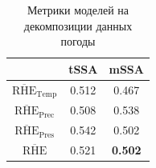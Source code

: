 	\def\arraystretch{1.2}
	\begin{table}[h!]
		\centering
		\caption{Метрики моделей на декомпозиции данных погоды}\label{tab:decomp_weather_results}
		\begin{tabular}{|c|c|c|}
			\hline
			& tSSA  & mSSA           \\ \hline
			$ \overline{\text{RHE}}_{\text{Temp}} $   & 0.512 & 0.467          \\ \hline
			$ \overline{\text{RHE}}_{\text{Prec}} $ & 0.508 & 0.538          \\ \hline
			$ \overline{\text{RHE}}_{\text{Pres}} $   & 0.542 & 0.502          \\ \hline
			$ \overline{\text{RHE}} $         & 0.521 & \textbf{0.502} \\ \hline
		\end{tabular}
	\end{table}
		
		\clearpage
		\printbibliography
	
